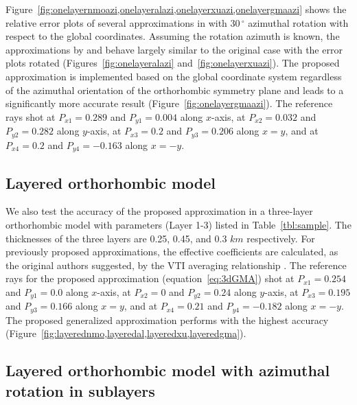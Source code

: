 Figure~\ref{fig:onelayernmoazi,onelayeralazi,onelayerxuazi,onelayergmaazi} shows the relative error plots of several approximations in  with  30$\,^{\circ}$ azimuthal rotation with respect to the global coordinates. Assuming the rotation azimuth is known, the approximations by \cite{alortho} and \cite{xu} behave largely similar to the original case with the error plots rotated (Figures~\ref{fig:onelayeralazi} and~\ref{fig:onelayerxuazi}). The proposed approximation is implemented based on the global coordinate system regardless of the azimuthal orientation of the orthorhombic symmetry plane and leads to a significantly more accurate result (Figure~\ref{fig:onelayergmaazi}). The reference rays  shot at $P_{x1} = 0.289$ and $P_{y1}=0.004$ along $x$-axis, at $P_{x2} = 0.032$ and $P_{y2}=0.282$ along $y$-axis, at $P_{x3}=0.2$ and $P_{y3}=0.206$ along $x=y$, and at $P_{x4}=0.2$ and $P_{y4}=-0.163$ along $x=-y$. 

\subsection{Layered orthorhombic model}

We also test the accuracy of the proposed approximation in a three-layer orthorhombic model  with parameters (Layer 1-3) listed in Table~\ref{tbl:sample}. The thicknesses of the three layers are 0.25, 0.45, and 0.3 $km$ respectively. For previously proposed approximations, the effective coefficients are calculated, as the original authors suggested, by the VTI averaging relationship \cite[]{hake,tsvankinthomsen1994}. The reference rays for the proposed approximation (equation~\ref{eq:3dGMA})  shot at $P_{x1} = 0.254$ and $P_{y1}=0.0$ along $x$-axis, at $P_{x2} = 0$ and $P_{y2}=0.24$ along $y$-axis, at $P_{x3}=0.195$ and $P_{y3}=0.166$ along $x=y$, and at $P_{x4}=0.21$ and $P_{y4}=-0.182$ along $x=-y$. The proposed generalized approximation performs with the highest accuracy (Figure~\ref{fig:layerednmo,layeredal,layeredxu,layeredgma}).

\subsection{Layered orthorhombic model with azimuthal rotation in sublayers}

